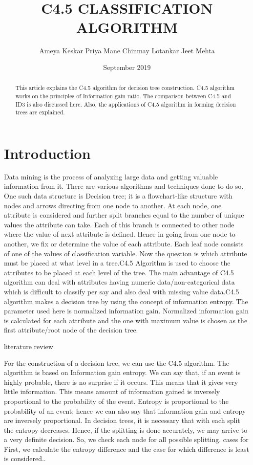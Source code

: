 \documentclass[aps,floatfix,prd,showpacs]{revtex4}
\begin{document}
\title{C4.5 CLASSIFICATION ALGORITHM}
\author{
Ameya Keskar                                                         Priya Mane
Chinmay Lotankar                                                     Jeet Mehta
}

\date{September 2019}

\begin{abstract}
This article explains the C4.5 algorithm for decision tree construction. C4.5 algorithm works on the principles of Information gain ratio. The comparison between C4.5 and ID3 is also discussed here. Also, the applications of C4.5 algorithm in forming decision trees are explained.  
\end{abstract}


\section{Introduction}

Data mining is the process of analyzing large data and getting valuable information from it. There are various algorithms and techniques done to do so. One such data structure is Decision tree; it is a flowchart-like structure with nodes and arrows directing from one node to another. At each node, one attribute is considered and further split branches equal to the number of unique values the attribute can take. Each of this branch is connected to other node where the value of next attribute is defined. Hence in going from one node to another, we fix or determine the value of each attribute. Each leaf node consists of one of the values of classification variable.
Now the question is which attribute must be placed at what level in a tree.C4.5 Algorithm is used to choose the attributes to be placed at each level of the tree. The main advantage of C4.5 algorithm can deal with attributes having numeric data/non-categorical data which is difficult to classify per say and also deal with missing value data.C4.5 algorithm makes a decision tree by using the concept of information entropy. The parameter used here is normalized information gain. Normalized information gain is calculated for each attribute and the one with maximum value is chosen as the first attribute/root node of the decision tree.


literature review

For the construction of a decision tree, we can use the C4.5 algorithm. The algorithm is based on Information gain entropy. We can say that, if an event is highly probable, there is no surprise if it occurs. This means that it gives very little information. This means amount of information gained is inversely proportional to the probability of the event. Entropy is proportional to the probability of an event; hence we can also say that information gain and entropy are inversely proportional.
In decision trees, it is necessary that with each split the entropy decreases. Hence, if the splitting is done accurately, we may arrive to a very definite decision. So, we check each node for all possible splitting. cases for First, we calculate the entropy difference and the case for which difference is least is considered..
\end{document}
